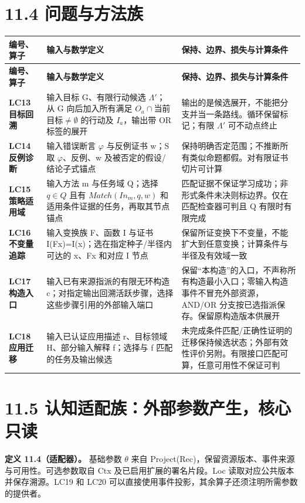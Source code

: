 \documentclass[UTF8,a4paper,zihao=-4,fontset=windows,openany]{ctexbook}
\def\mathrm#1{#1}%
\begin{document}
\section{11.4 问题与方法族}
\begingroup\small\setlength{\tabcolsep}{4pt}
\begin{longtable}{>{\raggedright\arraybackslash}p{}>{\raggedright\arraybackslash}p{}>{\raggedright\arraybackslash}p{}}
\toprule
\textbf{编号、算子} & \textbf{输入与数学定义} & \textbf{保持、边界、损失与计算条件} \\
\midrule
\endfirsthead
\toprule
\textbf{编号、算子} & \textbf{输入与数学定义} & \textbf{保持、边界、损失与计算条件} \\
\midrule
\endhead
\bottomrule
\endfoot
\bottomrule
\endlastfoot
\textbf{LC13 目标回溯} & 输入目标 G、有限行动候选 \(\Lambda'\)；从 G 向后加入所有满足 \(O_a\cap\)当前目标\(\ne\emptyset\) 的行动及 \(I_a\)，输出带 OR 标签的展开 & 输出的是候选展开，不能把分支并当一条路线。循环保留标记；有限 \(\Lambda'\) 可不动点终止 \\
\textbf{LC14 反例诊断} & 输入错误断言 \(\varphi\) 与反例证书 w；S 取 \(\varphi\)、反例、w 及被否定的假设/结论子式锚点 & 保持明确否定范围；不推断所有类似命题都假。对有限证书切片可计算 \\
\textbf{LC15 策略适用域} & 输入方法 m 与任务域 Q；选择 \(q\in Q\) 且有 \(\mathrm{Match}(\mathrm{In}_m,q,w)\) 和适用条件证据的任务，再取其节点锚点 & 匹配证据不保证学习成功；非形式条件未决则标边界。仅在匹配检查器可判且 Q 有限时有限完成 \\
\textbf{LC16 不变量追踪} & 输入变换族 F、函数 I 与证书 I(Fx)=I(x)；选在指定种子/半径内可达的 x、Fx 和对应 I 节点 & 保留所证变换下不变量，不能扩大到任意变换；计算条件与半径及有效域一致 \\
\textbf{LC17 构造入口} & 输入已有来源指派的有限无环构造 c；对指定输出回溯活跃步骤，选择这些步骤引用的外部输入端口 & 保留“本构造”的入口，不声称所有构造最小入口；零输入构造事件不冒充外部资源，AND/OR 分支按已选指派保存。保留原构造版本供展开 \\
\textbf{LC18 应用迁移} & 输入已认证应用描述 r、目标领域 H、部分输入解释 f；选择与 f 匹配的任务及输出候选 & 未完成条件匹配/正确性证明的迁移保持候选状态；外部有效性评价另附。有限接口匹配可算，任意可用性不保证可判 \\
\end{longtable}
\endgroup

\section{11.5 认知适配族：外部参数产生，核心只读}
\textbf{定义 11.4（适配器）。} 基础参数 \(\theta\) 来自 Project(Rec)，保留资源版本、事件来源与可用性。可选参数取自 Ctx 及已启用扩展的署名片段。Loc 读取对应公共版本并保存溯源。LC19 和 LC20 可以直接使用事件投影，其余算子还须注明所需参数的提供者。
\end{document}
